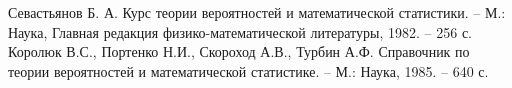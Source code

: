 \documentclass[a4paper,12pt]{article} %
\begin{document}
	
	\tableofcontents \newpage
	\listoffigures \newpage
	 \newpage
	
	\begin{thebibliography}{99}
		 Севастьянов Б. А. Курс теории вероятностей и математической статистики. -- М.: Наука, Главная редакция физико-математической литературы, 1982. -- 256 с.
		 Королюк В.С., Портенко Н.И., Скороход А.В., Турбин А.Ф. Справочник по теории вероятностей и математической статистике. -- М.: Наука, 1985. -- 640 с.
	\end{thebibliography}
\end{document}
